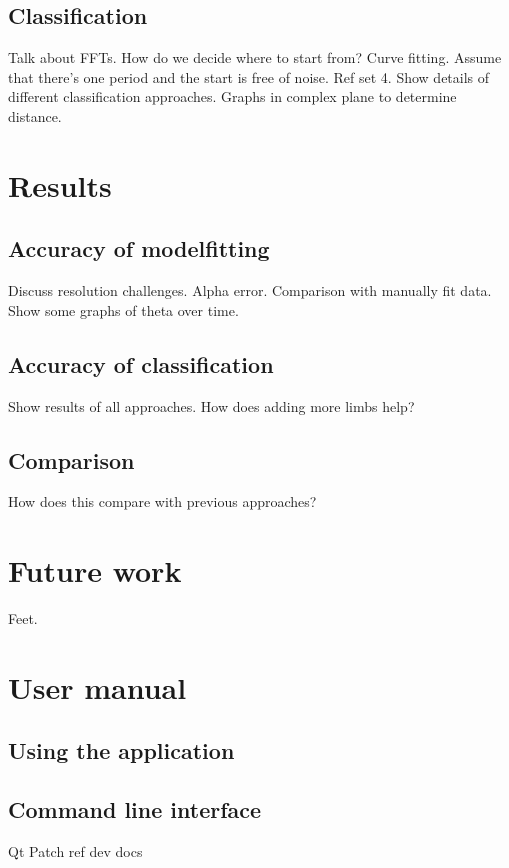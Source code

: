 \documentclass[a4paper,12pt]{report}
\begin{document}
\section{Classification}
Talk about FFTs.
How do we decide where to start from?  Curve fitting.
Assume that there's one period and the start is free of noise.  Ref set 4.
Show details of different classification approaches.
Graphs in complex plane to determine distance.

\chapter{Results}

\section{Accuracy of modelfitting}
Discuss resolution challenges.
Alpha error.
Comparison with manually fit data.
Show some graphs of theta over time.

\section{Accuracy of classification}
Show results of all approaches.
How does adding more limbs help?

\section{Comparison}
How does this compare with previous approaches?

\chapter{Future work}
Feet.



\newpage


\newpage
\appendix

\chapter{User manual}

\section{Using the application}
\section{Command line interface}
Qt Patch ref dev docs
\end{document}
